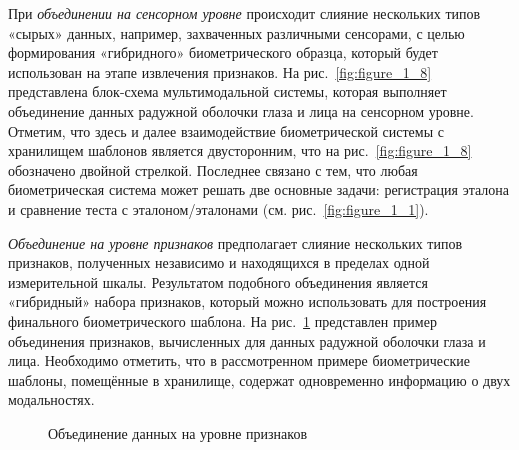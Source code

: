 \documentclass[12pt]{book}
\begin{document}
{\large{При \textit{объединении на сенсорном уровне} происходит слияние нескольких типов «сырых» данных, например, захваченных различными сенсорами, с целью формирования «гибридного» биометрического образца, который будет использован на этапе извлечения признаков. На рис.~\ref{fig:figure_1_8} представлена блок-схема мультимодальной системы, которая выполняет объединение данных радужной оболочки глаза и лица на сенсорном уровне. Отметим, что здесь и далее взаимодействие биометрической системы с хранилищем шаблонов является двусторонним, что на рис.~\ref{fig:figure_1_8} обозначено двойной стрелкой. Последнее связано с тем, что любая биометрическая система может решать две основные задачи: регистрация эталона и сравнение теста с эталоном/эталонами (см. рис.~\ref{fig:figure_1_1}).}

\large{\textit{Объединение на уровне признаков} предполагает слияние нескольких типов признаков, полученных независимо и находящихся в пределах одной измерительной шкалы. Результатом подобного объединения является «гибридный» набора признаков, который можно использовать для построения финального биометрического шаблона. На рис.~\ref{fig:figure_1_9} представлен пример объединения признаков, вычисленных для данных радужной оболочки глаза и лица. Необходимо отметить, что в рассмотренном примере биометрические шаблоны, помещённые в хранилище, содержат одновременно информацию о двух модальностях.}

\begin{figure}[h]
\caption{Объединение данных на уровне признаков}
\label{fig:figure_1_9}
\end{figure}

}
\end{document}
